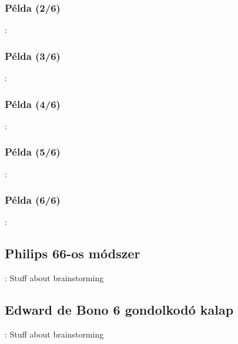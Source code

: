\documentclass{beamer}
\begin{document}
\subsubsection{Példa (2/6)}
\begin{frame}{\subsecname : \subsubsecname}
    
\end{frame}

\subsubsection{Példa (3/6)}
\begin{frame}{\subsecname : \subsubsecname}
    
\end{frame}

\subsubsection{Példa (4/6)}
\begin{frame}{\subsecname : \subsubsecname}
    
\end{frame}

\subsubsection{Példa (5/6)}
\begin{frame}{\subsecname : \subsubsecname}
    
\end{frame}

\subsubsection{Példa (6/6)}
\begin{frame}{\subsecname : \subsubsecname}
    
\end{frame}

\subsection{Philips 66-os módszer}
\begin{frame}{\secname : \subsecname}
    Stuff about brainstorming
\end{frame}

\subsection{Edward de Bono 6 gondolkodó kalap}
\begin{frame}{\secname : \subsecname}
    Stuff about brainstorming
\end{frame}
\end{document}
